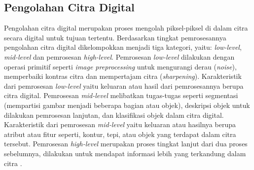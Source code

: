 \subsection{Pengolahan Citra Digital}
Pengolahan citra digital merupakan proses mengolah piksel-piksel di dalam citra secara digital untuk tujuan tertentu. Berdasarkan tingkat pemrosesannya pengolahan citra digital dikelompokkan menjadi tiga kategori, yaitu: \textit{low-level}, \textit{mid-level} dan pemrosesan \textit{high-level}. Pemrosesan \textit{low-level} dilakukan dengan operasi primitif seperti \textit{image preprocessing} untuk mengurangi derau (\textit{noise}), memperbaiki kontras citra dan mempertajam citra (\textit{sharpening}). Karakteristik dari pemrosesan \textit{low-level} yaitu keluaran atau hasil dari pemrosesannya berupa citra digital. Pemrosesan \textit{mid-level} melibatkan tugas-tugas seperti segmentasi (mempartisi gambar menjadi beberapa bagian atau objek), deskripsi objek untuk dilakukan pemrosesan lanjutan, dan klasifikasi objek dalam citra digital. Karakteristik dari pemrosesan \textit{mid-level} yaitu keluaran atau hasilnya berupa atribut atau fitur seperti, kontur, tepi, atau objek yang terdapat dalam citra tersebut. Pemrosesan \textit{high-level} merupakan proses tingkat lanjut dari dua proses sebelumnya, dilakukan untuk mendapat informasi lebih yang terkandung dalam citra \cite{book:gonzalez}.




